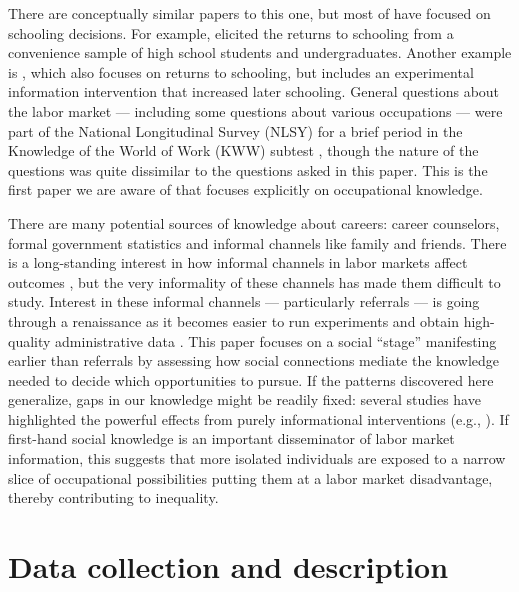 \documentclass[12pt]{article}
\begin{document}
There are conceptually similar papers to this one, but most of have focused on schooling decisions.  
For example, \cite{dominitz1996} elicited the returns to schooling from a convenience sample of high school students and undergraduates. 
Another example is \cite{jensen2010perceived}, which also focuses on returns to schooling, but includes an experimental information intervention that increased later schooling.   %
General questions about the labor market --- including some questions about various occupations --- were part of the National Longitudinal Survey (NLSY) for a brief period in the Knowledge of the World of Work (KWW) subtest \citep{kohen1975}, though the nature of the questions was quite dissimilar to the questions asked in this paper. 
This is the first paper we are aware of that focuses explicitly on occupational knowledge.

There are many potential sources of knowledge about careers: career counselors, formal government statistics and informal channels like family and friends. 
There is a long-standing interest in how informal channels in labor markets affect outcomes \citep{rees1966information, stigler1962information}, but the very informality of these channels has made them difficult to study. 
Interest in these informal channels --- particularly referrals --- is going through a renaissance as it becomes easier to run experiments \citep{pallais2013referential} and obtain high-quality administrative data \citep{burks2013value}.   
This paper focuses on a social ``stage'' manifesting earlier than referrals by assessing how social connections mediate the knowledge needed to decide which opportunities to pursue.  
If the patterns discovered here generalize, gaps in our knowledge might be readily fixed: 
several studies have highlighted the powerful effects from purely informational interventions (e.g., \citealp{dupas2009teenagers, card2010inequality}).
If first-hand social knowledge is an important disseminator of labor market information, this suggests that more isolated individuals are exposed to a narrow slice of occupational possibilities putting them at a labor market disadvantage, thereby contributing to inequality. 


\section{Data collection and description} 
\end{document}
